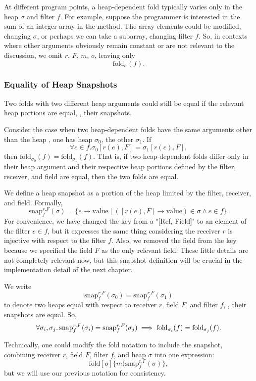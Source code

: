 \documentclass[msc,oneside]{ubcthesis}
\begin{document}
At different program points, a heap-dependent fold typically varies only in the heap $\sigma$ and filter $f$. For example, suppose the programmer is interested in the sum of an integer array in the method. The array elements could be modified, changing $\sigma$, or perhaps we can take a subarray, changing filter $f$. So, in contexts where other arguments obviously remain constant or are not relevant to the discussion, we omit $r$, $F$, $m$, $o$, leaving only
$$\textrm{fold}_{\sigma}(f).$$

\subsubsection{Equality of Heap Snapshots}
Two folds with two different heap arguments could still be equal if the relevant heap portions are equal, \ie, their snapshots. 

Consider the case when two heap-dependent folds have the same arguments other than the heap \ie, one has heap $\sigma_0$, the other $\sigma_1$. If $$\forall e \in f. \sigma_0[r(e), F] = \sigma_1[r(e), F],$$ then
$\textrm{fold}_{\sigma_0}(f) = \textrm{fold}_{\sigma_1}(f)$. That is, if two heap-dependent folds differ only in their heap argument and their respective heap portions defined by the filter, receiver, and field are equal, then the two folds are equal. 

We define a heap snapshot as a portion of the heap limited by the filter, receiver, and field. Formally,
$$\textrm{snap}^{r.F}_{f}(\sigma) = \{ e \rightarrow \textrm{value} \mid ([r(e), F] \rightarrow \textrm{value}) \in \sigma \land e \in f\}.$$ For convenience, we have changed the key from a "[Ref, Field]" to an element of the filter $e \in f$, but it expresses the same thing considering the receiver $r$ is injective with respect to the filter $f$. Also, we removed the field from the key because we specified the field $F$ as the only relevant field. These little details are not completely relevant now, but this snapshot definition will be crucial in the implementation detail of the next chapter.

We write
$$\textrm{snap}^{r.F}_{f}(\sigma_0) = \textrm{snap}^{r.F}_{f}(\sigma_1)$$ to denote two heaps equal with respect to receiver $r$, field $F$, and filter $f$, \ie, their snapshots are equal. So, $$\forall \sigma_i, \sigma_j \ldotp \textrm{snap}^{r.F}_{f}(\sigma_i) = \textrm{snap}^{r.F}_{f}(\sigma_j) \implies \textrm{fold}_{\sigma_i}(f) = \textrm{fold}_{\sigma_j}(f).$$ 

Technically, one could modify the fold notation to include the snapshot, combining receiver $r$, field $F$, filter $f$, and heap $\sigma$ into one expression: $$\textrm{fold}[o]\{m(\textrm{snap}^{r.F}_{f}(\sigma)\},$$ but we will use our previous notation for consistency.
\end{document}
